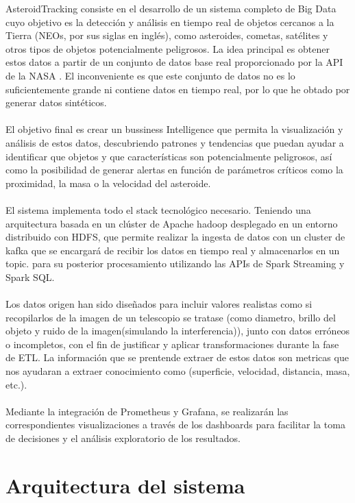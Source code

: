 \documentclass[12pt]{article}
\begin{document}
AsteroidTracking consiste en el desarrollo de un sistema completo de Big Data cuyo objetivo es la detección 
y análisis en tiempo real de objetos cercanos a la Tierra (NEOs, por sus siglas en inglés), como asteroides,
cometas, satélites y otros tipos de objetos potencialmente peligrosos. La idea principal es obtener estos datos
a partir de un conjunto de datos base real proporcionado por la API de la NASA  \cite[(Sentry System)]{Sentry-System}.
El inconveniente es que este conjunto de datos no es lo suficientemente grande ni contiene datos en tiempo real,
por lo que he obtado por generar datos sintéticos.
\\
\\
El objetivo final es crear un bussiness Intelligence que permita la visualización y análisis de estos datos,
descubriendo patrones y tendencias que puedan ayudar a identificar que objetos y que características son
potencialmente peligrosos, así como la posibilidad de generar alertas en función de parámetros críticos como
la proximidad, la masa o la velocidad del asteroide.
\\
\\
El sistema implementa todo el stack tecnológico necesario. Teniendo una arquitectura basada en 
un clúster de Apache hadoop desplegado en un entorno distribuido con HDFS, que permite realizar
la ingesta de datos con un cluster de kafka que se encargará de recibir
los datos en tiempo real y almacenarlos en un topic. para su posterior procesamiento utilizando
las APIs de Spark Streaming y Spark SQL.
\\
\\
Los datos origen han sido diseñados para incluir valores realistas como si recopilarlos de la imagen
de un telescopio se tratase (como diametro, brillo del objeto y ruido de la imagen(simulando la interferencia)), 
junto con datos erróneos o incompletos, con el fin de justificar y aplicar transformaciones durante la fase de ETL.
La información que se prentende extraer de estos datos son metricas que nos ayudaran a extraer conocimiento como
(superficie, velocidad, distancia, masa, etc.).
\\
\\
Mediante la integración de Prometheus y Grafana, se realizarán las correspondientes visualizaciones 
a través de los dashboards para facilitar la toma de decisiones y el análisis exploratorio de 
los resultados.

\clearpage

\section{Arquitectura del sistema}
\end{document}
